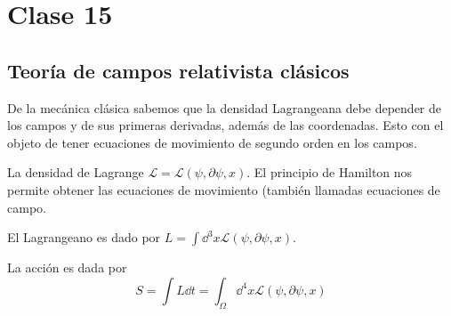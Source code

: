 \section{Clase 15}
\subsection{Teoría de campos relativista clásicos}
De la mecánica clásica sabemos que la densidad Lagrangeana debe depender de los campos y de sus primeras derivadas, además de las coordenadas. Esto con el objeto de tener ecuaciones de movimiento de segundo orden en los campos. 

La densidad de Lagrange $\mathcal{L}=\mathcal{L}(\psi,\partial\psi,x)$. El principio de Hamilton nos permite obtener las ecuaciones de movimiento (también llamadas ecuaciones de campo. 

El Lagrangeano es dado por $L=\int\dd^3x \mathcal{L}(\psi,\partial\psi,x)$.

 La acción es dada por
\begin{equation}
  S=\int L\dd t=\int_\Omega\dd^4x \mathcal{L}(\psi,\partial\psi,x)
\end{equation}

